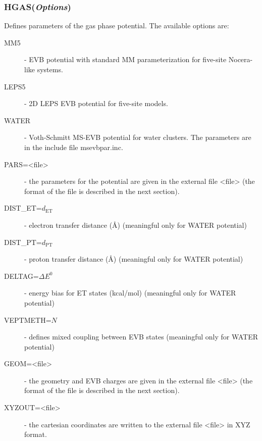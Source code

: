 \documentclass[oneside,11pt,openany]{book}
\newcommand{\tw}{\ttfamily}
\begin{document}
\subsubsection*{HGAS({\it Options})}
Defines parameters of the gas phase potential. The available options are:
\begin{description}
\item[{\tw MM5}] - EVB potential with standard MM parameterization
for five-site Nocera-like systems.

\item[{\tw LEPS5}] - 2D LEPS EVB potential for five-site models.

\item[{\tw WATER}] - Voth-Schmitt MS-EVB potential for water clusters.
The parameters are in the include file {\tw msevbpar.inc}.

\item[{\tw PARS=<file>}] - the parameters for the potential are
given in the external file {\tw <file>} (the format of the file
is described in the next section).

\item[{\tw DIST\_ET=$d_\mathrm{ET}$}] - electron transfer distance
(\AA) (meaningful only for WATER potential)

\item[{\tw DIST\_PT=$d_\mathrm{PT}$}] - proton transfer distance
(\AA) (meaningful only for WATER potential)

\item[{\tw DELTAG=$\Delta E^0$}] - energy bias for ET states
(kcal/mol) (meaningful only for WATER potential)

\item[{\tw VEPTMETH=$N$}] - defines mixed coupling between EVB states
(meaningful only for WATER potential)

\item[{\tw GEOM=<file>}] - the geometry and EVB charges are given
in the external file {\tw <file>} (the format of the file
is described in the next section).

\item[{\tw XYZOUT=<file>}] - the cartesian coordinates
are written to the external file {\tw <file>} in XYZ format.
\end{description}
\end{document}
